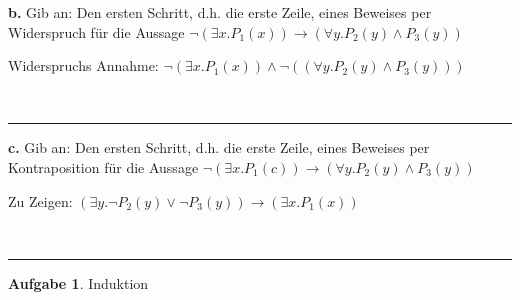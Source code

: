 \documentclass[10pt,leqno ]{article}
\theoremstyle{definition}
\newtheorem{problem}[theorem]{Aufgabe}
\newenvironment{solution}[1][L]{\begin{doublespace}\textbf{#1.}\quad }{\ \rule{0.5em}{0.5em}\end{doublespace}}
\begin{document}
\begin{solution}[b]
    Gib an: Den ersten Schritt, d.h. die erste Zeile, eines Beweises per Widerspruch für die
    Aussage \( \lnot(\exists x . P_1(x)) \rightarrow (\forall y . P_2(y) \land P_3(y)) \)

    Widerspruchs Annahme: \( \lnot(\exists x . P_1(x)) \land \lnot ((\forall y . P_2(y) \land P_3(y))) \)

\end{solution}

\begin{solution}[c]
    Gib an: Den ersten Schritt, d.h. die erste Zeile, eines Beweises per Kontraposition für die
    Aussage \( \lnot(\exists x . P_1(c)) \rightarrow (\forall y . P_2(y) \land P_3(y)) \)

    Zu Zeigen: \( (\exists y . \lnot P_2(y) \lor \lnot P_3(y)) \rightarrow (\exists x . P_1(x)) \)

\end{solution}

\begin{problem}
    Induktion
\end{problem}
\end{document}
